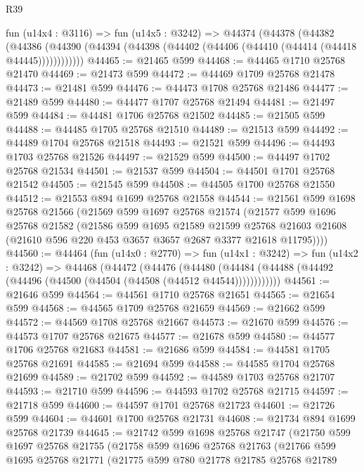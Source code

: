 \begin{lexlean}{R39}
\begin{coremodule}
    fun (u14x4 : @3116) =>
    fun (u14x5 : @3242) =>
    @44374
      (@44378
        (@44382
          (@44386 (@44390 (@44394 (@44398 (@44402 (@44406 (@44410 (@44414 (@44418 @44445))))))))))))
@44465 := @21465 @599
@44468 := @44465 @1710 @25768 @21470
@44469 := @21473 @599
@44472 := @44469 @1709 @25768 @21478
@44473 := @21481 @599
@44476 := @44473 @1708 @25768 @21486
@44477 := @21489 @599
@44480 := @44477 @1707 @25768 @21494
@44481 := @21497 @599
@44484 := @44481 @1706 @25768 @21502
@44485 := @21505 @599
@44488 := @44485 @1705 @25768 @21510
@44489 := @21513 @599
@44492 := @44489 @1704 @25768 @21518
@44493 := @21521 @599
@44496 := @44493 @1703 @25768 @21526
@44497 := @21529 @599
@44500 := @44497 @1702 @25768 @21534
@44501 := @21537 @599
@44504 := @44501 @1701 @25768 @21542
@44505 := @21545 @599
@44508 := @44505 @1700 @25768 @21550
@44512 := @21553 @894 @1699 @25768 @21558
@44544 := @21561
    @599
    @1698
    @25768
    @21566
    (@21569
      @599
      @1697
      @25768
      @21574
      (@21577
        @599
        @1696
        @25768
        @21582
        (@21586
          @599
          @1695
          @21589
          @21599
          @25768
          @21603
          @21608
          (@21610 @596 @220 @453 @3657 @3657 @2687 @3377 @21618 @11795))))
@44560 := @44464
    (fun (u14x0 : @2770) =>
    fun (u14x1 : @3242) =>
    fun (u14x2 : @3242) =>
    @44468
      (@44472
        (@44476
          (@44480 (@44484 (@44488 (@44492 (@44496 (@44500 (@44504 (@44508 (@44512 @44544))))))))))))
@44561 := @21646 @599
@44564 := @44561 @1710 @25768 @21651
@44565 := @21654 @599
@44568 := @44565 @1709 @25768 @21659
@44569 := @21662 @599
@44572 := @44569 @1708 @25768 @21667
@44573 := @21670 @599
@44576 := @44573 @1707 @25768 @21675
@44577 := @21678 @599
@44580 := @44577 @1706 @25768 @21683
@44581 := @21686 @599
@44584 := @44581 @1705 @25768 @21691
@44585 := @21694 @599
@44588 := @44585 @1704 @25768 @21699
@44589 := @21702 @599
@44592 := @44589 @1703 @25768 @21707
@44593 := @21710 @599
@44596 := @44593 @1702 @25768 @21715
@44597 := @21718 @599
@44600 := @44597 @1701 @25768 @21723
@44601 := @21726 @599
@44604 := @44601 @1700 @25768 @21731
@44608 := @21734 @894 @1699 @25768 @21739
@44645 := @21742
    @599
    @1698
    @25768
    @21747
    (@21750
      @599
      @1697
      @25768
      @21755
      (@21758
        @599
        @1696
        @25768
        @21763
        (@21766
          @599
          @1695
          @25768
          @21771
          (@21775
            @599
            @780
            @21778
            @21785
            @25768
            @21789

\end{coremodule}
\end{lexlean}
